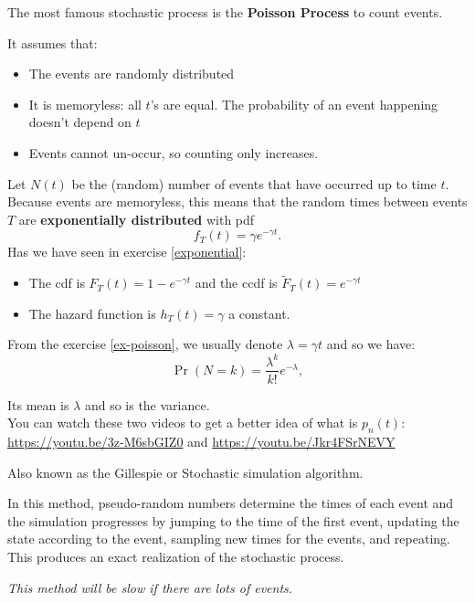 \begin{SaveDefinition}[key=Poisson, title={Poisson Process}]

The most famous stochastic process is the \textbf{Poisson Process} to count events. 

It assumes that:
\begin{itemize}
	\item The events are randomly distributed
	\item It is memoryless: all $t$'s are equal. The probability of an event happening doesn't depend on $t$
	\item Events cannot un-occur, so counting only increases.
\end{itemize}


Let $N(t)$ be the (random) number of events that have occurred up to time $t$.
Because events are memoryless, this means that the random times between events $T$ are \textbf{exponentially distributed} with pdf
\[
f_T(t) = \gamma e^{-\gamma t}.
\]
Has we have seen in exercise \ref{exponential}:
\begin{itemize}
	\item The cdf is $F_T(t) = 1-e^{-\gamma t}$ and the ccdf is $\tilde{F}_T(t) = e^{-\gamma t}$
	\item The hazard function is $h_T(t) = \gamma$ a constant.
\end{itemize}	

\end{SaveDefinition}


\begin{SaveDefinition}[key=Poisson2, title={Poisson Process}]

From the exercise \ref{ex-poisson}, we usually denote $\lambda = \gamma t$ and so we have:
\[
\Pr(N=k) = \frac{\lambda^k}{k!} e^{-\lambda},
\]

Its mean is $\lambda$ and so is the variance.\\

You can watch these two videos to get a better idea of what is $p_n(t)$: \url{https://youtu.be/3z-M6sbGIZ0} and \url{https://youtu.be/Jkr4FSrNEVY}
\end{SaveDefinition}



\begin{SaveDefinition}[key=discrete-event, title={Discrete Event Method}]

Also known as the Gillespie or Stochastic simulation algorithm.

In this method, pseudo-random numbers determine the times of each event and the simulation progresses by jumping to the time of the first event, updating the state according to the event, sampling new times for the events, and repeating. This produces an exact realization of the stochastic process.

\textit{This method will be slow if there are lots of events.}
\end{SaveDefinition}


